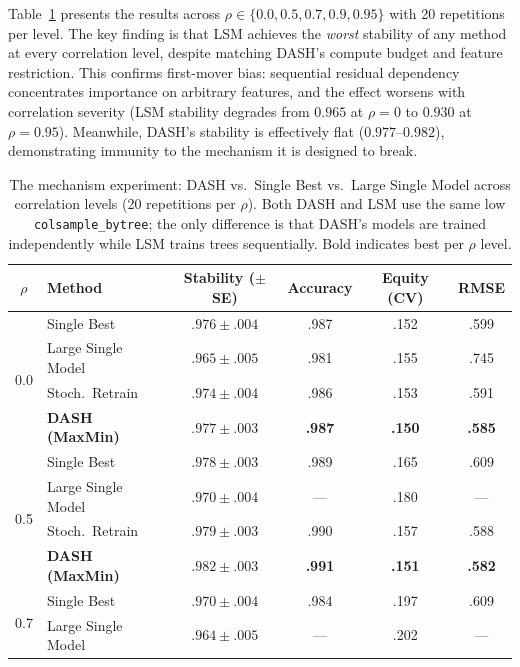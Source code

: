 \documentclass[11pt]{article}
\newcommand{\dash}{\textsc{DASH}}
\newcommand{\rhovar}{\rho}
\begin{document}
Table~\ref{tab:sweep} presents the results across
$\rhovar \in \{0.0, 0.5, 0.7, 0.9, 0.95\}$ with 20 repetitions per
level. The key finding is that LSM achieves the \emph{worst}
stability of any method at every correlation level, despite matching
\dash{}'s compute budget and feature restriction. This confirms
first-mover bias: sequential residual dependency concentrates
importance on arbitrary features, and the effect worsens with
correlation severity (LSM stability degrades from $0.965$ at
$\rhovar = 0$ to $0.930$ at $\rhovar = 0.95$). Meanwhile, \dash{}'s
stability is effectively flat ($0.977$--$0.982$), demonstrating
immunity to the mechanism it is designed to break.

\begin{table}[h]
\centering
\caption{The mechanism experiment: \dash{} vs.\ Single Best vs.\ Large
Single Model across correlation levels (20 repetitions per $\rhovar$).
Both \dash{} and LSM use the same low \texttt{colsample\_bytree}; the
only difference is that \dash{}'s models are trained independently while
LSM trains trees sequentially. Bold indicates best per $\rhovar$ level.}
\label{tab:sweep}
\small
\begin{tabular}{clcccc}
\toprule
$\rhovar$ & \textbf{Method} & \textbf{Stability ($\pm$SE)} & \textbf{Accuracy} &
  \textbf{Equity (CV)} & \textbf{RMSE} \\
\midrule
\multirow{4}{*}{0.0}
  & Single Best          & $.976 \pm .004$ & .987 & .152 & .599 \\
  & Large Single Model   & $.965 \pm .005$ & .981 & .155 & .745 \\
  & Stoch.\ Retrain      & $.974 \pm .004$ & .986 & .153 & .591 \\
  & \textbf{DASH (MaxMin)} & $\mathbf{.977} \pm .003$ & \textbf{.987} &
    \textbf{.150} & \textbf{.585} \\
\midrule
\multirow{4}{*}{0.5}
  & Single Best          & $.978 \pm .003$ & .989 & .165 & .609 \\
  & Large Single Model   & $.970 \pm .004$ & --- & .180 & --- \\
  & Stoch.\ Retrain      & $.979 \pm .003$ & .990 & .157 & .588 \\
  & \textbf{DASH (MaxMin)} & $\mathbf{.982} \pm .003$ & \textbf{.991} &
    \textbf{.151} & \textbf{.582} \\
\midrule
\multirow{4}{*}{0.7}
  & Single Best          & $.970 \pm .004$ & .984 & .197 & .609 \\
  & Large Single Model   & $.964 \pm .005$ & --- & .202 & --- \\

\end{tabular}
\end{table}
\end{document}
